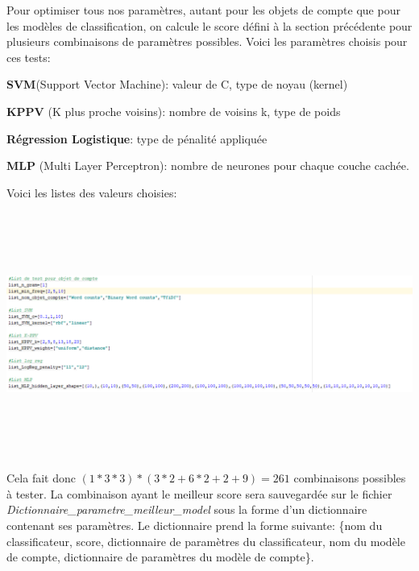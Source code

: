 Pour optimiser tous nos paramètres, autant pour les objets de compte que pour les modèles de classification, on calcule le score défini à la section précédente pour plusieurs combinaisons de paramètres possibles. Voici les paramètres choisis pour ces tests:

\begin{description}
\item \textbf{SVM}(Support Vector Machine): valeur de C, type de noyau (kernel)
\item \textbf{KPPV} (K plus proche voisins): nombre de voisins k, type de poids
\item \textbf{Régression Logistique}: type de pénalité appliquée
\item \textbf{MLP} (Multi Layer Perceptron): nombre de neurones pour chaque couche cachée.
\end{description}
Voici les listes des valeurs choisies:

\includegraphics[width=\linewidth,height=8cm]{images/list_param}

Cela fait donc $(1*3*3) *(3*2 + 6*2 + 2 + 9)=261$ combinaisons possibles à tester. La combinaison ayant le meilleur score sera sauvegardée sur le fichier \emph{Dictionnaire\_parametre\_meilleur\_model} sous la forme d'un dictionnaire contenant ses paramètres. Le dictionnaire prend la forme suivante: \{nom du classificateur, score, dictionnaire de paramètres du classificateur, nom du modèle de compte, dictionnaire de paramètres du modèle de compte\}.
